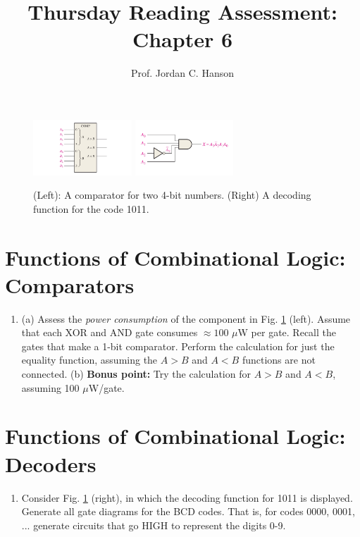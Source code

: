 \documentclass{article}
\begin{document}
\title{Thursday Reading Assessment: Chapter 6}
\author{Prof. Jordan C. Hanson}

\maketitle

\begin{figure}[ht]
\centering
\includegraphics[width=0.33\textwidth]{figures/comparator3.pdf} \hspace{0.5cm}
\includegraphics[width=0.33\textwidth]{figures/decoder2.pdf}
\caption{\label{fig:1} (Left): A comparator for two 4-bit numbers. (Right) A decoding function for the code 1011.}
\end{figure}

\section{Functions of Combinational Logic: Comparators}

\begin{enumerate}
\item (a) Assess the \textit{power consumption} of the component in Fig. \ref{fig:1} (left).  Assume that each XOR and AND gate consumes $\approx 100$ $\mu$W per gate.  Recall the gates that make a 1-bit comparator.  Perform the calculation for just the equality function, assuming the $A>B$ and $A<B$ functions are not connected.  (b) \textbf{Bonus point:} Try the calculation for $A>B$ and $A<B$, assuming 100 $\mu$W/gate.  \\ \vspace{3cm}
\end{enumerate}

\section{Functions of Combinational Logic: Decoders}

\begin{enumerate}
\item Consider Fig. \ref{fig:1} (right), in which the decoding function for 1011 is displayed.  Generate all gate diagrams for the BCD codes.  That is, for codes 0000, 0001, ... generate circuits that go HIGH to represent the digits 0-9. \\ \vspace{5cm}
\end{enumerate}
\end{document}
